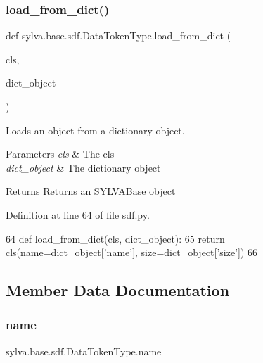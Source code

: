 \subsubsection{\texorpdfstring{load\+\_\+from\+\_\+dict()}{load\_from\_dict()}}
{\footnotesize\ttfamily def sylva.\+base.\+sdf.\+Data\+Token\+Type.\+load\+\_\+from\+\_\+dict (\begin{DoxyParamCaption}\item[{}]{cls,  }\item[{}]{dict\+\_\+object }\end{DoxyParamCaption})}



Loads an object from a dictionary object. 


\begin{DoxyParams}{Parameters}
{\em cls} & The cls \\
\hline
{\em dict\+\_\+object} & The dictionary object\\
\hline
\end{DoxyParams}
\begin{DoxyReturn}{Returns}
Returns an S\+Y\+L\+V\+A\+Base object 
\end{DoxyReturn}


Definition at line 64 of file sdf.\+py.


\begin{DoxyCode}
64     \textcolor{keyword}{def }load\_from\_dict(cls, dict\_object):
65         \textcolor{keywordflow}{return} cls(name=dict\_object[\textcolor{stringliteral}{'name'}], size=dict\_object[\textcolor{stringliteral}{'size'}])
66 
\end{DoxyCode}


\subsection{Member Data Documentation}
\mbox{\label{classsylva_1_1base_1_1sdf_1_1_data_token_type_a64214bba14fcba747fd608caef007924}} 
\subsubsection{\texorpdfstring{name}{name}}
{\footnotesize\ttfamily sylva.\+base.\+sdf.\+Data\+Token\+Type.\+name}



